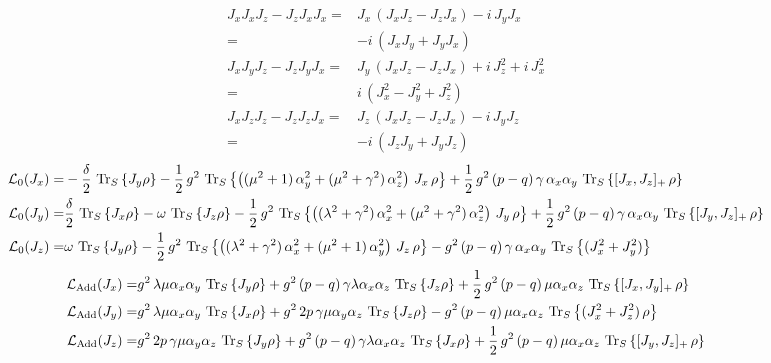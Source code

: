 \documentclass{article}
\begin{document}
\begin{align*}
    J_x J_x J_z - J_z J_x J_x =& J_x\,(J_x J_z - J_z J_x)-i\,J_y J_x\\
    =&-i\,(J_x J_y + J_y J_x)\\
    J_x J_y J_z - J_z J_y J_x =& J_y\,(J_x J_z - J_z J_x) + i\,J_z^2 + i\,J_x^2\\
    =&i\,(J_x^2 - J_y^2 + J_z^2)\\
    J_x J_z J_z - J_z J_z J_x =& J_z\,(J_x J_z -J_z J_x)-i\,J_y J_z\\
    =&-i\,(J_z J_y+ J_y J_z)
\end{align*}
\begin{align*}
    \mathcal{L}_0(J_x)=&-\frac{\delta}{2}\,\operatorname{Tr}_S\left\{J_y\rho\right\}-\frac{1}{2}\,g^2\,\operatorname{Tr}_S\left\{\left((\mu^2+1)\,\alpha_y^2+ (\mu^2+\gamma^2)\,\alpha_z^2\right)\,J_x\,\rho\right\}+\frac{1}{2}\,g^2\,(p-q)\,\gamma\,\alpha_x\alpha_y\,\operatorname{Tr}_S\left\{[J_x,J_z]_+\,\rho\right\}\\
    \mathcal{L}_0(J_y)=&\frac{\delta}{2}\,\operatorname{Tr}_S\left\{J_x\rho\right\}-\omega\,\operatorname{Tr}_S\left\{J_z\rho\right\}-\frac{1}{2}\,g^2\,\operatorname{Tr}_S\left\{\left((\lambda^2+\gamma^2)\,\alpha_x^2+(\mu^2+\gamma^2)\,\alpha_z^2\right)\,J_y\,\rho\right\}+\frac{1}{2}\,g^2\,(p-q)\,\gamma\,\alpha_x\alpha_y\,\operatorname{Tr}_S\left\{[J_y,J_z]_+\,\rho\right\}\\
    \mathcal{L}_0(J_z)=&\omega\,\operatorname{Tr}_S\left\{J_y\rho\right\}-\frac{1}{2}\,g^2\,\operatorname{Tr}_S\left\{\left((\lambda^2+\gamma^2)\,\alpha_x^2+(\mu^2+1)\,\alpha_y^2\right)\,J_z\,\rho\right\}-g^2\,(p-q)\,\gamma\,\alpha_x\alpha_y\,\operatorname{Tr}_S\left\{(J_x^2+ J_y^2)\right\}
\end{align*}
\begin{align*}
    \mathcal{L}_\text{Add}(J_x)=&g^2\,\lambda\mu\alpha_x\alpha_y\,\operatorname{Tr}_S\left\{J_y\rho\right\}+g^2\,(p-q)\,\gamma\lambda\alpha_x\alpha_z\,\operatorname{Tr}_S\left\{J_z\rho\right\}+\frac{1}{2}\,g^2\,(p-q)\,\mu\alpha_x\alpha_z\,\operatorname{Tr}_S\left\{[J_x,J_y]_+\,\rho\right\}\\
    \mathcal{L}_\text{Add}(J_y)=&g^2\,\lambda\mu\alpha_x\alpha_y\,\operatorname{Tr}_S\left\{J_x\rho\right\}+g^2\,2p\,\gamma\mu\alpha_y\alpha_z\,\operatorname{Tr}_S\left\{J_z\rho\right\}-g^2\,(p-q)\,\mu\alpha_x\alpha_z\,\operatorname{Tr}_S\left\{(J_x^2+J_z^2)\,\rho\right\}\\
    \mathcal{L}_\text{Add}(J_z)=&g^2\,2p\,\gamma\mu\alpha_y\alpha_z\,\operatorname{Tr}_S\left\{J_y\rho\right\}+g^2\,(p-q)\,\gamma\lambda\alpha_x\alpha_z\,\operatorname{Tr}_S\left\{J_x\rho\right\}+\frac{1}{2}\,g^2\,(p-q)\,\mu\alpha_x\alpha_z\,\operatorname{Tr}_S\left\{[J_y,J_z]_+\,\rho\right\}
\end{align*}
\end{document}
